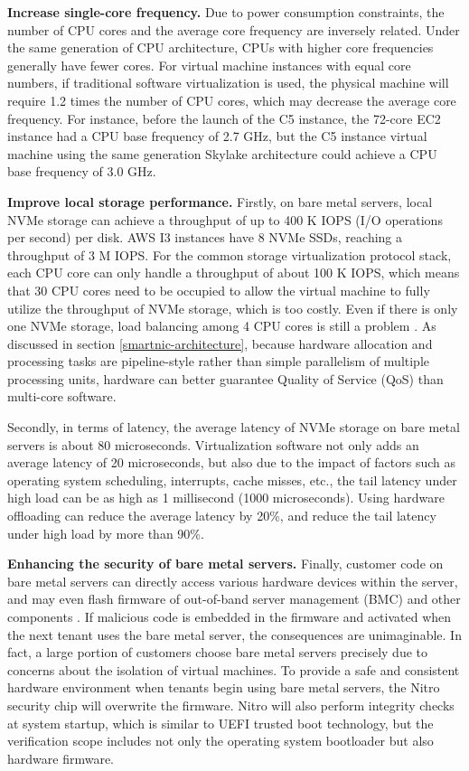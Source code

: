 \textbf{Increase single-core frequency.}
Due to power consumption constraints, the number of CPU cores and the average core frequency are inversely related. Under the same generation of CPU architecture, CPUs with higher core frequencies generally have fewer cores. For virtual machine instances with equal core numbers, if traditional software virtualization is used, the physical machine will require 1.2 times the number of CPU cores, which may decrease the average core frequency. For instance, before the launch of the C5 instance, the 72-core EC2 instance had a CPU base frequency of 2.7 GHz, but the C5 instance virtual machine using the same generation Skylake architecture could achieve a CPU base frequency of 3.0 GHz.

\textbf{Improve local storage performance.}
Firstly, on bare metal servers, local NVMe storage can achieve a throughput of up to 400 K IOPS (I/O operations per second) per disk. AWS I3 instances have 8 NVMe SSDs, reaching a throughput of 3 M IOPS. For the common storage virtualization protocol stack, each CPU core can only handle a throughput of about 100 K IOPS, which means that 30 CPU cores need to be occupied to allow the virtual machine to fully utilize the throughput of NVMe storage, which is too costly. Even if there is only one NVMe storage, load balancing among 4 CPU cores is still a problem \cite{li2017kv}. As discussed in section \ref{smartnic-architecture}, because hardware allocation and processing tasks are pipeline-style rather than simple parallelism of multiple processing units, hardware can better guarantee Quality of Service (QoS) than multi-core software.

Secondly, in terms of latency, the average latency of NVMe storage on bare metal servers is about 80 microseconds. Virtualization software not only adds an average latency of 20 microseconds, but also due to the impact of factors such as operating system scheduling, interrupts, cache misses, etc., the tail latency under high load can be as high as 1 millisecond (1000 microseconds). Using hardware offloading can reduce the average latency by 20\%, and reduce the tail latency under high load by more than 90\%.

\textbf{Enhancing the security of bare metal servers.}
Finally, customer code on bare metal servers can directly access various hardware devices within the server, and may even flash firmware of out-of-band server management (BMC) and other components \cite{bare-metal-security}. If malicious code is embedded in the firmware and activated when the next tenant uses the bare metal server, the consequences are unimaginable. In fact, a large portion of customers choose bare metal servers precisely due to concerns about the isolation of virtual machines. To provide a safe and consistent hardware environment when tenants begin using bare metal servers, the Nitro security chip will overwrite the firmware. Nitro will also perform integrity checks at system startup, which is similar to UEFI trusted boot technology, but the verification scope includes not only the operating system bootloader but also hardware firmware.

